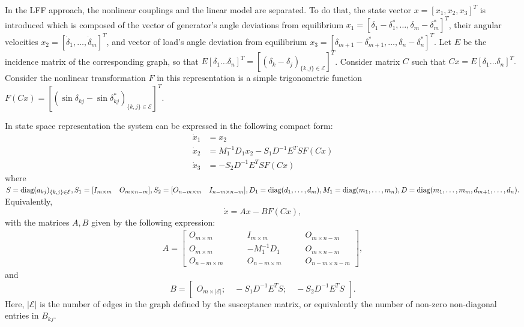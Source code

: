 \documentclass[final]{IEEEtran}
\begin{document}
In the LFF approach, the nonlinear couplings and the
linear model are separated. To do that, the state vector $x =
[x_1,x_2,x_3]^T$ is introduced which is composed of the vector of generator's
angle deviations from equilibrium $x_1 = [\delta_1 -
\delta_1^*,\dots, \delta_m - \delta_m^*]^T$, their angular
velocities $x_2 = [\dot\delta_1,\dots,\dot\delta_m]^T$, and vector
of load's angle deviation from equilibrium
$x_3=[\delta_{m+1}-\delta_{m+1}^*,\dots,\delta_n-\delta_n^*]^T$.
Let $E$ be the incidence matrix of the corresponding graph, so
that $E[\delta_1\dots\delta_n]^T =
[(\delta_k-\delta_j)_{\{k,j\}\in\mathcal{E}}]^T$. Consider matrix
$C$ such that $Cx=E[\delta_1\dots\delta_n]^T.$  Consider the
nonlinear transformation $F$ in this representation is a simple
trigonometric function $
F(Cx)=[(\sin\delta_{kj}-\sin\delta^*_{kj})_{\{k,j\}\in\mathcal{E}}]^T.$

In state space representation the system can be expressed in the
following compact form:
\begin{align}
\dot{x}_1 &=x_2 \nonumber \\
\dot{x}_2 &=M_1^{-1}D_1x_2-S_1D^{-1}E^TSF(Cx)  \\
\dot{x}_3 &= -S_2D^{-1}E^TS F(Cx) \nonumber
\end{align}
where $S=\emph{\emph{diag}}(a_{kj})_{\{k,j\}\in \mathcal{E}},
S_1=[I_{m\times m}\quad O_{m\times n-m}], S_2=[O_{n-m\times m}
\quad I_{n-m\times n-m}], D_1=\emph{\emph{diag}}(d_1,\dots,d_m),
M_1=\emph{\emph{diag}}(m_1,\dots,m_n),
D=\emph{\emph{diag}}(m_1,\dots,m_m,d_{m+1},\dots,d_n).$
Equivalently, 
\begin{equation}\label{eq.Bilinear}
 \dot x = A x - B F(C x),
\end{equation}
with the matrices $A,B$ given by the following expression:
\begin{align*}
A=\left[
        \begin{array}{ccccc}
          O_{m \times m} \qquad & I_{m \times m}  \qquad & O_{m \times n-m}\\
          O_{m \times m} \qquad & -M_1^{-1}D_1 \qquad & O_{m \times n-m} \\
          O_{n-m \times m} \qquad &O_{n-m \times m} \qquad & O_{n-m \times n-m}
        \end{array}
      \right],
\end{align*}
and $$
 B= \left[
        \begin{array}{ccccc}
          O_{m \times |\mathcal{E}|}; \quad
          -S_1D^{-1}E^TS; \quad
          -S_2D^{-1}E^TS
        \end{array}
      \right].$$
Here, $|\mathcal{E}|$ is the number of edges in the graph defined
by the susceptance matrix, or equivalently the number of non-zero
non-diagonal entries in $B_{kj}$.
\end{document}
